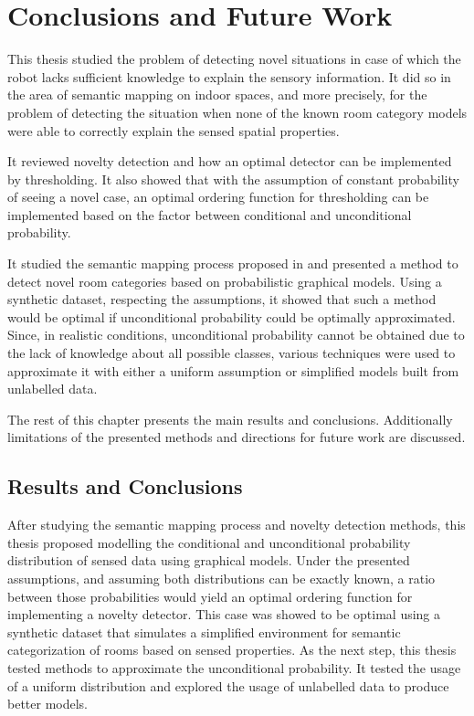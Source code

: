 \chapter{Conclusions and Future Work}\label{chap:conclusions}

This thesis studied the problem of detecting novel situations in case of which the robot
lacks sufficient knowledge to explain the sensory information. It did so in the area of 
semantic mapping on indoor spaces, and more precisely, for the problem of detecting the situation when
none of the known room category models were able to correctly explain the sensed spatial properties.

It reviewed novelty detection and how an optimal detector can be implemented by
thresholding. It also showed that with the assumption of constant probability of seeing a
novel case, an optimal ordering function for thresholding can be implemented based on
the factor between conditional and unconditional probability.

It studied the semantic mapping process proposed in \cite{pronobis2011semmap} and presented 
a method to detect novel room categories based on probabilistic graphical models.
Using a synthetic dataset, respecting the assumptions, it showed that such a method would be 
optimal if unconditional probability could be optimally approximated. Since, in realistic conditions, 
unconditional probability cannot be obtained due to the lack of knowledge about all possible classes, various
techniques were used to approximate it with either a uniform assumption or simplified models built from 
unlabelled data.

The rest of this chapter presents the main results and conclusions. Additionally limitations of the 
presented methods and directions for future work are discussed.


\section{Results and Conclusions}

After studying the semantic mapping process and novelty detection methods, this
thesis proposed modelling the conditional and unconditional probability distribution of sensed
data using graphical models. Under the presented assumptions, and assuming both distributions can be 
exactly known, a ratio between those probabilities would yield an optimal ordering function for implementing a
novelty detector. This case was showed to be optimal using a synthetic dataset that simulates a simplified
environment for semantic categorization of rooms based on sensed properties.
As the next step, this thesis tested methods to approximate the unconditional probability. 
It tested the usage of a uniform distribution and explored the usage of unlabelled data to 
produce better models.

